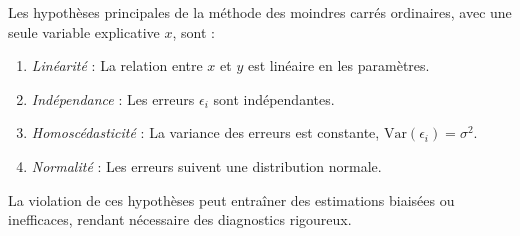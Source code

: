 Les hypothèses principales de la méthode des moindres carrés ordinaires, avec une seule variable explicative $x$, sont :
\begin{enumerate}
	\item \emph{Linéarité} : La relation entre $x$ et $y$ est linéaire en les paramètres.
	\item \emph{Indépendance} : Les erreurs $\epsilon_i$ sont indépendantes.
	\item \emph{Homoscédasticité} : La variance des erreurs est constante, $\mathrm{Var}(\epsilon_i) = \sigma^2$.
	\item \emph{Normalité} : Les erreurs suivent une distribution normale.
\end{enumerate}
La violation de ces hypothèses peut entraîner des estimations biaisées ou inefficaces, rendant nécessaire des diagnostics rigoureux.


